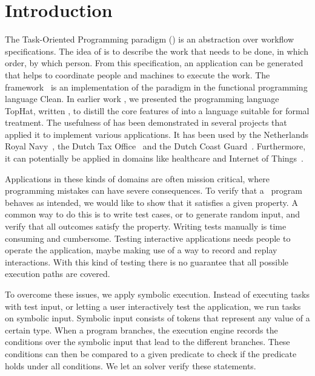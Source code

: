 
\section{Introduction}

The Task-Oriented Programming paradigm (\TOP) is an abstraction over workflow specifications.
The idea of \TOP is to describe the work that needs to be done, in which order, by which person.
From this specification, an application can be generated that helps to coordinate people and machines to execute the work.
The \ITASKS framework~\cite{DBLP:conf/ppdp/PlasmeijerLMAK12} is an implementation of the paradigm in the functional programming language Clean.
In earlier work \cite{DBLP:conf/ppdp/SteenvoordenNK19}, we presented the programming language TopHat, written \TOPHAT, to distill the core features of \TOP into a language suitable for formal treatment.
%
The usefulness of \TOP has been demonstrated in several projects that applied it to implement various applications.
It has been used by the Netherlands Royal Navy~\cite{jansen2018dynamic}, the Dutch Tax Office~\cite{conf/sfp/StutterheimAP17} and the Dutch Coast Guard~\cite{lijnse2012incidone}. %
Furthermore, it can potentially be applied in domains like healthcare and Internet of Things~\cite{DBLP:conf/cgo/KoopmanLP18}.

Applications in these kinds of domains are often mission critical, where programming mistakes can have severe consequences.
To verify that a \TOPHAT\ program behaves as intended, we would like to show that it satisfies a given property.
A common way to do this is to write test cases, or to generate random input, and verify that all outcomes satisfy the property.
Writing tests manually is time consuming and cumbersome.
Testing interactive applications needs people to operate the application, maybe making use of a way to record and replay interactions.
With this kind of testing there is no guarantee that all possible execution paths are covered.

To overcome these issues, we apply symbolic execution.
Instead of executing tasks with test input, or letting a user interactively test the application,
we run tasks on symbolic input.
Symbolic input consists of tokens that represent any value of a certain type.
When a program branches, the execution engine records the conditions over the symbolic input that lead to the different branches.
These conditions can then be compared to a given predicate to check if the predicate holds under all conditions.
We let an \SMT solver verify these statements.

